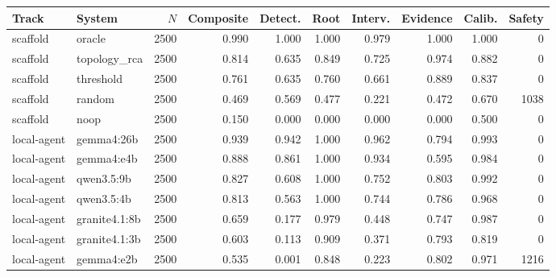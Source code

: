 \begin{tabular}{llrrrrrrrr}
\toprule
Track & System & $N$ & Composite & Detect. & Root & Interv. & Evidence & Calib. & Safety \\
\midrule
scaffold & oracle & 2500 & 0.990 & 1.000 & 1.000 & 0.979 & 1.000 & 1.000 & 0 \\
scaffold & topology\_rca & 2500 & 0.814 & 0.635 & 0.849 & 0.725 & 0.974 & 0.882 & 0 \\
scaffold & threshold & 2500 & 0.761 & 0.635 & 0.760 & 0.661 & 0.889 & 0.837 & 0 \\
scaffold & random & 2500 & 0.469 & 0.569 & 0.477 & 0.221 & 0.472 & 0.670 & 1038 \\
scaffold & noop & 2500 & 0.150 & 0.000 & 0.000 & 0.000 & 0.000 & 0.500 & 0 \\
local-agent & gemma4:26b & 2500 & 0.939 & 0.942 & 1.000 & 0.962 & 0.794 & 0.993 & 0 \\
local-agent & gemma4:e4b & 2500 & 0.888 & 0.861 & 1.000 & 0.934 & 0.595 & 0.984 & 0 \\
local-agent & qwen3.5:9b & 2500 & 0.827 & 0.608 & 1.000 & 0.752 & 0.803 & 0.992 & 0 \\
local-agent & qwen3.5:4b & 2500 & 0.813 & 0.563 & 1.000 & 0.744 & 0.786 & 0.968 & 0 \\
local-agent & granite4.1:8b & 2500 & 0.659 & 0.177 & 0.979 & 0.448 & 0.747 & 0.987 & 0 \\
local-agent & granite4.1:3b & 2500 & 0.603 & 0.113 & 0.909 & 0.371 & 0.793 & 0.819 & 0 \\
local-agent & gemma4:e2b & 2500 & 0.535 & 0.001 & 0.848 & 0.223 & 0.802 & 0.971 & 1216 \\
\bottomrule
\end{tabular}
